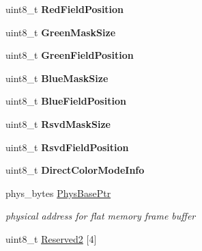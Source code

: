 \begin{DoxyCompactItemize}
\item 
\hypertarget{struct____attribute_____a20cb142b8c1b0a2b41244fef469a11f4}{}\label{struct____attribute_____a20cb142b8c1b0a2b41244fef469a11f4} 
uint8\+\_\+t {\bfseries Red\+Field\+Position}
\item 
\hypertarget{struct____attribute_____ac7b4df72e505b74493e7d5144cbac743}{}\label{struct____attribute_____ac7b4df72e505b74493e7d5144cbac743} 
uint8\+\_\+t {\bfseries Green\+Mask\+Size}
\item 
\hypertarget{struct____attribute_____a602b28f8e5da781eabfd736743a6ea09}{}\label{struct____attribute_____a602b28f8e5da781eabfd736743a6ea09} 
uint8\+\_\+t {\bfseries Green\+Field\+Position}
\item 
\hypertarget{struct____attribute_____a84842a6a42e881ce7be87482122bcc4e}{}\label{struct____attribute_____a84842a6a42e881ce7be87482122bcc4e} 
uint8\+\_\+t {\bfseries Blue\+Mask\+Size}
\item 
\hypertarget{struct____attribute_____a4d0396c07a4f07556332fec2b4a6c2bf}{}\label{struct____attribute_____a4d0396c07a4f07556332fec2b4a6c2bf} 
uint8\+\_\+t {\bfseries Blue\+Field\+Position}
\item 
\hypertarget{struct____attribute_____a87d544680f1132f30b038c0ebf0b829b}{}\label{struct____attribute_____a87d544680f1132f30b038c0ebf0b829b} 
uint8\+\_\+t {\bfseries Rsvd\+Mask\+Size}
\item 
\hypertarget{struct____attribute_____aa357b085181776f2918a6df25c88846b}{}\label{struct____attribute_____aa357b085181776f2918a6df25c88846b} 
uint8\+\_\+t {\bfseries Rsvd\+Field\+Position}
\item 
\hypertarget{struct____attribute_____a3bf2fd2394ec8649ec3d26104be35dd7}{}\label{struct____attribute_____a3bf2fd2394ec8649ec3d26104be35dd7} 
uint8\+\_\+t {\bfseries Direct\+Color\+Mode\+Info}
\item 
\hypertarget{struct____attribute_____a1d11f4921094db253fc2c2ee6fbb2afb}{}\label{struct____attribute_____a1d11f4921094db253fc2c2ee6fbb2afb} 
phys\+\_\+bytes \hyperlink{struct____attribute_____a1d11f4921094db253fc2c2ee6fbb2afb}{Phys\+Base\+Ptr}
\begin{DoxyCompactList}\small\item\em physical address for flat memory frame buffer \end{DoxyCompactList}\item 
\hypertarget{struct____attribute_____a09b5824ec5c67bee2a4b36c0ab5181bc}{}\label{struct____attribute_____a09b5824ec5c67bee2a4b36c0ab5181bc} 
uint8\+\_\+t \hyperlink{struct____attribute_____a09b5824ec5c67bee2a4b36c0ab5181bc}{Reserved2} \mbox{[}4\mbox{]}

\end{DoxyCompactItemize}
